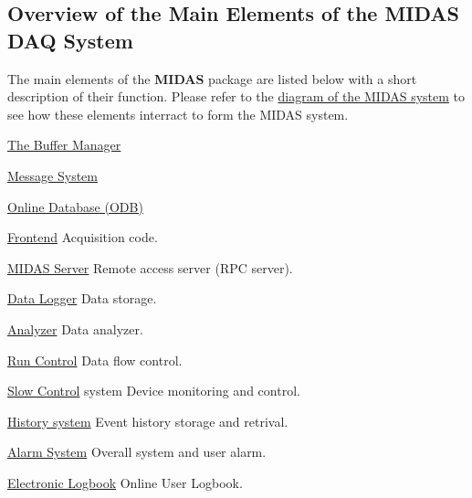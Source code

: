  \subsection{Overview of the Main Elements of the MIDAS DAQ System}\label{F_MainElements}


\par


The main elements of the {\bfseries MIDAS} package are listed below with a short description of their function. Please refer to the \hyperlink{I_Midas_system_picture}{diagram of the MIDAS system} to see how these elements interract to form the MIDAS system.

\label{F_MainElements_idx_midas_features}
\hypertarget{F_MainElements_idx_midas_features}{}

\begin{DoxyItemize}
\item \hyperlink{F_MainElements_F_Buffer_Manager_overview}{The Buffer Manager}
\item \hyperlink{F_MainElements_F_Message_System_overview}{Message System}
\item \hyperlink{F_MainElements_F_Online_Database_overview}{Online Database (ODB)}
\item \hyperlink{F_MainElements_F_Frontend_sec_overview}{Frontend} Acquisition code.
\item \hyperlink{F_MainElements_F_Midas_Server_overview}{MIDAS Server} Remote access server (RPC server).
\item \hyperlink{F_MainElements_F_Data_Logger_overview}{Data Logger} Data storage.
\item \hyperlink{F_MainElements_F_Analyzer_sec_overview}{Analyzer} Data analyzer.
\item \hyperlink{F_MainElements_F_Run_Control_overview}{Run Control} Data flow control.
\item \hyperlink{F_MainElements_F_Slow_Control_overview}{Slow Control} system Device monitoring and control.
\item \hyperlink{F_MainElements_F_History_System_overview}{History system} Event history storage and retrival.
\item \hyperlink{F_MainElements_F_Alarm_System_overview}{Alarm System} Overall system and user alarm.
\item \hyperlink{F_MainElements_F_Electronic_Logbook_overview}{Electronic Logbook} Online User Logbook.
\end{DoxyItemize}

